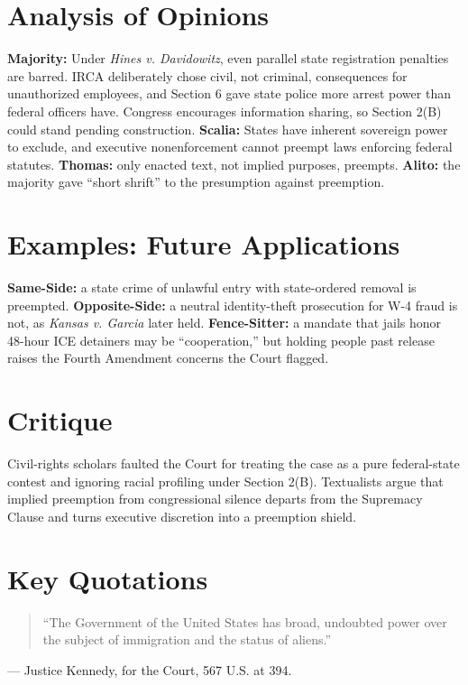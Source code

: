 \documentclass[12pt]{article}
\begin{document}
\section{Analysis of Opinions}
\textbf{Majority:} Under \textit{Hines v. Davidowitz}, even parallel state registration penalties are barred. IRCA deliberately chose civil, not criminal, consequences for unauthorized employees, and Section 6 gave state police more arrest power than federal officers have. Congress encourages information sharing, so Section 2(B) could stand pending construction. \textbf{Scalia:} States have inherent sovereign power to exclude, and executive nonenforcement cannot preempt laws enforcing federal statutes. \textbf{Thomas:} only enacted text, not implied purposes, preempts. \textbf{Alito:} the majority gave ``short shrift'' to the presumption against preemption.

\section{Examples: Future Applications}
\textbf{Same-Side:} a state crime of unlawful entry with state-ordered removal is preempted. \textbf{Opposite-Side:} a neutral identity-theft prosecution for W-4 fraud is not, as \textit{Kansas v. Garcia} later held. \textbf{Fence-Sitter:} a mandate that jails honor 48-hour ICE detainers may be ``cooperation,'' but holding people past release raises the Fourth Amendment concerns the Court flagged.

\section{Critique}
Civil-rights scholars faulted the Court for treating the case as a pure federal-state contest and ignoring racial profiling under Section 2(B). Textualists argue that implied preemption from congressional silence departs from the Supremacy Clause and turns executive discretion into a preemption shield.

\section{Key Quotations}
\begin{quote}
``The Government of the United States has broad, undoubted power over the subject of immigration and the status of aliens.''
\end{quote}
\noindent --- Justice Kennedy, for the Court, 567 U.S. at 394.
\end{document}
